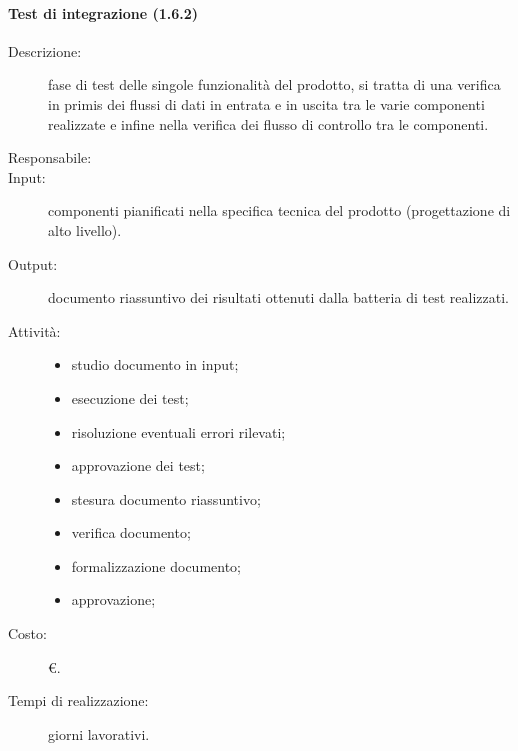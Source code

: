 \paragraph{Test di integrazione (1.6.2)}
\begin{description}
\item[Descrizione:] fase di test delle singole funzionalità del prodotto, si tratta di una verifica in primis dei flussi di dati in entrata e in uscita tra le varie componenti realizzate e infine nella verifica dei flusso di controllo tra le componenti.
\item[Responsabile:] 
\item[Input:] componenti pianificati nella specifica tecnica del prodotto (progettazione di alto livello).
\item[Output:] documento riassuntivo dei risultati ottenuti dalla batteria di test realizzati.
\item[Attività:]
\begin{itemize}
\item studio documento in input;
\item esecuzione dei test;
\item risoluzione eventuali errori rilevati;
\item approvazione dei test;
\item stesura documento riassuntivo;
\item verifica documento;
\item formalizzazione documento;
\item approvazione;
\end{itemize}
\item[Costo:] \euro{}.
\item[Tempi di realizzazione:]  giorni lavorativi.
\end{description}

